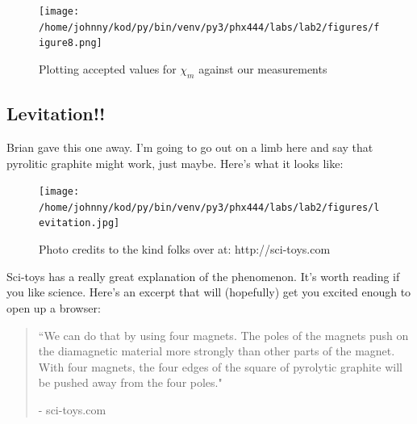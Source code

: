 \documentclass{article}
\begin{document}
\begin{figure}[H]
        \begin{center}
        \texttt{[image: /home/johnny/kod/py/bin/venv/py3/phx444/labs/lab2/figures/figure8.png]}
        \caption{Plotting accepted values for $\chi_m$ against our measurements}
        \label{fig:fig_5}
        \end{center}
\end{figure}

\subsection{Levitation!!}
Brian gave this one away. I'm going to go out on a limb here and say that
pyrolitic graphite might work, just maybe. Here's what it looks like:


\begin{figure}[H]
        \begin{center}
        \texttt{[image: /home/johnny/kod/py/bin/venv/py3/phx444/labs/lab2/figures/levitation.jpg]}
        \caption{Photo credits to the kind folks over at: http://sci-toys.com}
        \label{fig:fig_6}
        \end{center}
\end{figure}

Sci-toys has a really great explanation of the phenomenon. It's worth reading
if you like science. Here's an excerpt that will (hopefully) get you excited
enough to open up a browser:
\begin{quotation}

 ``We can do that by using four magnets. The poles of the magnets push on the
 diamagnetic material more strongly than other parts of the magnet. With four
 magnets, the four edges of the square of pyrolytic graphite will be pushed
 away from the four poles."

 - sci-toys.com

\end{quotation}
\end{document}
